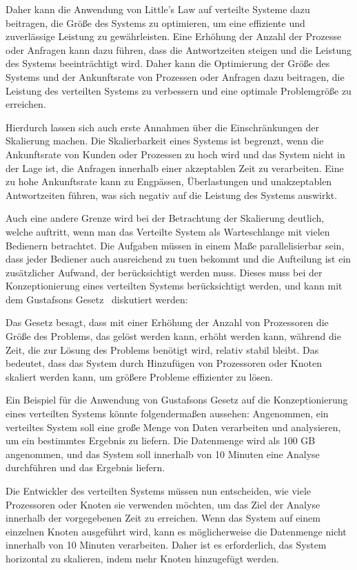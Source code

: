\begin{itemize}
Daher kann die Anwendung von Little's Law auf verteilte Systeme dazu beitragen, die Größe des Systems zu optimieren, um eine effiziente und zuverlässige Leistung zu gewährleisten. Eine Erhöhung der Anzahl der Prozesse oder Anfragen kann dazu führen, dass die Antwortzeiten steigen und die Leistung des Systems beeinträchtigt wird. Daher kann die Optimierung der Größe des Systems und der Ankunftsrate von Prozessen oder Anfragen dazu beitragen, die Leistung des verteilten Systems zu verbessern und eine optimale Problemgröße zu erreichen.

Hierdurch lassen sich auch erste Annahmen über die Einschränkungen der Skalierung machen. Die Skalierbarkeit eines Systems ist begrenzt, wenn die Ankunftsrate von Kunden oder Prozessen zu hoch wird und das System nicht in der Lage ist, die Anfragen innerhalb einer akzeptablen Zeit zu verarbeiten. Eine zu hohe Ankunftsrate kann zu Engpässen, Überlastungen und unakzeptablen Antwortzeiten führen, was sich negativ auf die Leistung des Systems auswirkt. 

Auch eine andere Grenze wird bei der Betrachtung der Skalierung deutlich, welche auftritt, wenn man das Verteilte System als Warteschlange mit vielen Bedienern betrachtet. Die Aufgaben müssen in einem Maße parallelisierbar sein, dass jeder Bediener auch ausreichend zu tuen bekommt und die Aufteilung ist ein zusätzlicher Aufwand, der berücksichtigt werden muss. Dieses muss bei der Konzeptionierung eines verteilten Systems berücksichtigt werden, und kann mit dem Gustafsons Gesetz~\cite{gustafson1988reevaluating} diskutiert werden: 

Das Gesetz besagt, dass mit einer Erhöhung der Anzahl von Prozessoren die Größe des Problems, das gelöst werden kann, erhöht werden kann, während die Zeit, die zur Lösung des Problems benötigt wird, relativ stabil bleibt. Das bedeutet, dass das System durch Hinzufügen von Prozessoren oder Knoten skaliert werden kann, um größere Probleme effizienter zu lösen.

Ein Beispiel für die Anwendung von Gustafsons Gesetz auf die Konzeptionierung eines verteilten Systems könnte folgendermaßen aussehen: Angenommen, ein verteiltes System soll eine große Menge von Daten verarbeiten und analysieren, um ein bestimmtes Ergebnis zu liefern. Die Datenmenge wird als 100 GB angenommen, und das System soll innerhalb von 10 Minuten eine Analyse durchführen und das Ergebnis liefern.

Die Entwickler des verteilten Systems müssen nun entscheiden, wie viele Prozessoren oder Knoten sie verwenden möchten, um das Ziel der Analyse innerhalb der vorgegebenen Zeit zu erreichen. Wenn das System auf einem einzelnen Knoten ausgeführt wird, kann es möglicherweise die Datenmenge nicht innerhalb von 10 Minuten verarbeiten. Daher ist es erforderlich, das System horizontal zu skalieren, indem mehr Knoten hinzugefügt werden.


\end{itemize}
